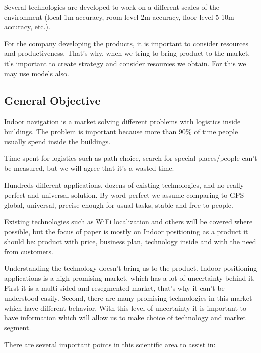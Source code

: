 Several technologies are developed to work on a different scales of the environment (local \< 1m accuracy, room level \< 2m accuracy, floor level 5-10m accuracy, etc.).

For the company developing the products, it is important to consider resources and productiveness. That's why, when we tring to bring product to the market, it's important to create strategy and consider resources we obtain. For this we may use models also.


\subsection{General Objective}


%
Indoor navigation is a market solving different problems with logistics inside buildings. The problem is important because more than 90\% of time people usually spend inside the buildings\cite{Indoor_Generation}.

Time spent for logistics such as path choice, search for special places/people can't be measured, but we will agree that it's a wasted time.

Hundreds different applications, dozens of existing technologies, and no really perfect and universal solution. By word perfect we assume comparing to GPS - global, universal, precise enough for usual tasks, stable and free to people.

Existing technologies such as WiFi localization and others will be covered where possible, but the focus of paper is mostly on Indoor positioning as a product it should be: product with price, business plan, technology inside and with the need from customers.

Understanding the technology doesn't bring us to the product.
Indoor positioning applications is a high promising market, which has a lot of uncertainty behind it. First it is a multi-sided and resegmented market, that's why it can't be understood easily. Second, there are many promising technologies in this market which have different behavior. With this level of uncertainty it is important to have information which will allow us to make choice of technology and market segment.

There are several important points in this scientific area to assist in:


